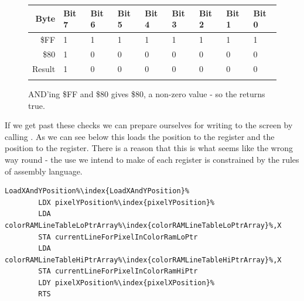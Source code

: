 \begin{figure}[H]
  {
    \setlength{\tabcolsep}{3.0pt}
    \setlength\cmidrulewidth{\heavyrulewidth} %
    \begin{adjustbox}{width=7cm,center}

      \begin{tabular}{rllllllll}
        \toprule
        Byte & Bit 7 & Bit 6 & Bit 5 & Bit 4 & Bit 3 & Bit 2 & Bit 1 & Bit 0        \\
        \midrule
        \$FF & 1 & 1 & 1 & 1 & 1 & 1 & 1 & 1 \\
        \$80 & 1 & 0 & 0 & 0 & 0 & 0 & 0 & 0 \\
        \midrule
        Result & 1 & 0 & 0 & 0 & 0 & 0 & 0 & 0 \\
        \addlinespace
        \bottomrule
      \end{tabular}
    \end{adjustbox}
    }\caption*{AND'ing \$FF and \$80 gives \$80, a non-zero value - so the  returns true.}
\end{figure}

If we get past these checks we can prepare ourselves for writing to the screen by calling . As we can
see below this loads the  position to the  register and the  position to the  register. There
is a reason that this is what seems like the wrong way round - the use we intend to make of each register is constrained by the
rules of assembly language.

\begin{lstlisting}[escapechar=\%]
LoadXAndYPosition%\index{LoadXAndYPosition}%   
        LDX pixelYPosition%\index{pixelYPosition}%
        LDA colorRAMLineTableLoPtrArray%\index{colorRAMLineTableLoPtrArray}%,X
        STA currentLineForPixelInColorRamLoPtr
        LDA colorRAMLineTableHiPtrArray%\index{colorRAMLineTableHiPtrArray}%,X
        STA currentLineForPixelInColorRamHiPtr
        LDY pixelXPosition%\index{pixelXPosition}%
        RTS 
\end{lstlisting}

